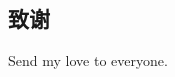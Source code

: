 \documentclass[twoside]{CUGThesis}
\begin{document}
\begin{spacing}{2}
	\section*{致谢}
	Send my love to everyone.
\end{spacing}
{}

\clearpage


{}
\end{document}
